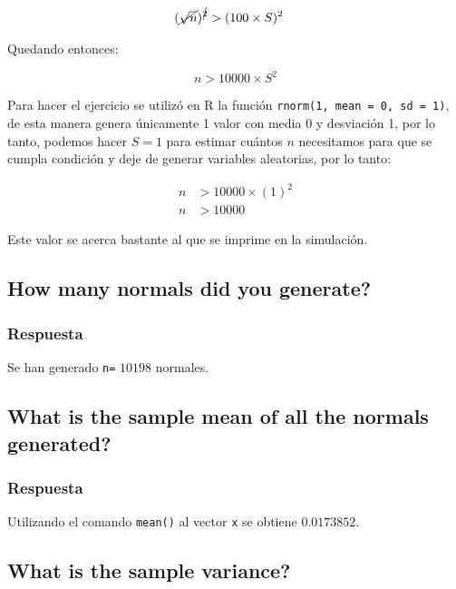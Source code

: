 \documentclass[12pt]{article}\usepackage[]{graphicx}\usepackage[]{xcolor}
\begin{document}
\begin{align*}
  (\cancel{\sqrt{n}})^{\cancel{2}} &> (100 \times S)^{2} 
\end{align*}

Quedando entonces:

\[
n > 10000\times S^{2}
\]

Para hacer el ejercicio se utilizó en \textsf{R} la función \texttt{rnorm(1, mean = 0, sd = 1)}, de esta manera genera únicamente 1 valor con media 0 y desviación 1, por lo tanto, podemos hacer $S = 1$ para estimar cuántos $n$ necesitamos para que se cumpla condición y deje de generar variables aleatorias, por lo tanto:

\begin{align*}
  n &> 10000 \times (1)^{2} \\
  n &> 10000 
\end{align*}

Este valor se acerca bastante al que se imprime en la simulación. 











\subsection{How many normals did you generate?}
\label{subsec:p1-b}

\subsubsection{Respuesta}

Se han generado \lstinline|n=| $10198$ normales.


\subsection{What is the sample mean of all the normals generated?}
\label{subsec:p1-c}




\subsubsection{Respuesta}

Utilizando el comando \lstinline|mean()| al vector \lstinline|x| se obtiene $0.0173852$. 

\subsection{What is the sample variance?}
\label{subsec:p1-d}
\end{document}
